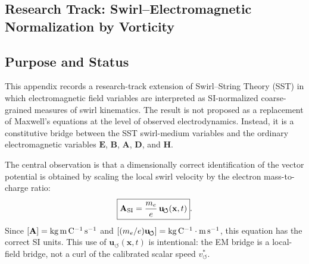 \subsection{Research Track: Swirl--Electromagnetic Normalization by Vorticity}
\label{app:research_swirl_em_vorticity}

\providecommand{\swirlarrow}{\boldsymbol{\circlearrowleft}}
\providecommand{\vswirl}{\mathbf{v}_{\!\boldsymbol{\circlearrowleft}}}
\providecommand{\vnorm}{\lVert\mathbf{v}_{\!\boldsymbol{\circlearrowleft}}\rVert}
\providecommand{\vchar}{v_{\!\boldsymbol{\circlearrowleft}}^{\ast}}
\providecommand{\uswirl}{\mathbf{u}_{\!\boldsymbol{\circlearrowleft}}}
\providecommand{\omegaswirl}{\boldsymbol{\omega}_{\!\boldsymbol{\circlearrowleft}}}
\providecommand{\rhoF}{\rho_{\!f}}
\providecommand{\rhoE}{\rho_{\!E}}
\providecommand{\rhoM}{\rho_{\!m}}
\providecommand{\rc}{r_c}
\providecommand{\Fmax}{F_{\max}^{\rm swirl}}

\subsection{Purpose and Status}
    
    This appendix records a research-track extension of Swirl--String Theory
    (SST) in which electromagnetic field variables are interpreted as
    SI-normalized coarse-grained measures of swirl kinematics.  The result is
    not proposed as a replacement of Maxwell's equations at the level of
    observed electrodynamics.  Instead, it is a constitutive bridge between
    the SST swirl-medium variables and the ordinary electromagnetic variables
    \(\mathbf{E}\), \(\mathbf{B}\), \(\mathbf{A}\), \(\mathbf{D}\), and
    \(\mathbf{H}\).
    
    The central observation is that a dimensionally correct identification of
    the vector potential is obtained by scaling the local swirl velocity by the
    electron mass-to-charge ratio:
    \begin{equation}
        \boxed{
            \mathbf{A}_{\rm SI}
            =
            \frac{m_e}{e}\,
            \uswirl(\mathbf{x},t)
        } .
        \label{eq:swirl_vector_potential_bridge}
    \end{equation}
    Since \([\mathbf{A}]={\rm kg\,m\,C^{-1}\,s^{-1}}\) and
    \([(m_e/e)\uswirl]={\rm kg\,C^{-1}}\cdot{\rm m\,s^{-1}}\), this equation
    has the correct SI units. This use of \(\uswirl(\mathbf{x},t)\) is intentional: the EM bridge is a local-field bridge, not a curl of the calibrated scalar speed \(\vchar\).

